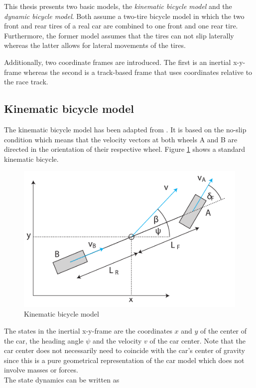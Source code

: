 This thesis presents two basic models, the \emph{kinematic bicycle model} and the \emph{dynamic bicycle model}. Both assume a two-tire bicycle model in which the two front and rear tires of a real car are combined to one front and one rear tire. Furthermore, the former model assumes that the tires can not slip laterally whereas the latter allows for lateral movements of the tires.

Additionally, two coordinate frames are introduced. The first is an inertial x-y-frame whereas the second is a track-based frame that uses coordinates relative to the race track.

\subsection{Kinematic bicycle model}
The kinematic bicycle model has been adapted from \cite{rajamani2005vehicle}. It is based on the no-slip condition which means that the velocity vectors at both wheels A and B are directed in the orientation of their respective wheel.
Figure \ref{fig:kinModel} shows a standard kinematic bicycle.
\begin{figure}[ht]
	\centering
  	\includegraphics{../../Figures/Models/KinModel.pdf}
	\caption{Kinematic bicycle model}
	\label{fig:kinModel}
\end{figure}
The states in the inertial x-y-frame are the coordinates $x$ and $y$ of the center of the car, the heading angle $\psi$ and the velocity $v$ of the car center. Note that the car center does not necessarily need to coincide with the car's center of gravity since this is a pure geometrical representation of the car model which does not involve masses or forces.\\
The state dynamics can be written as
